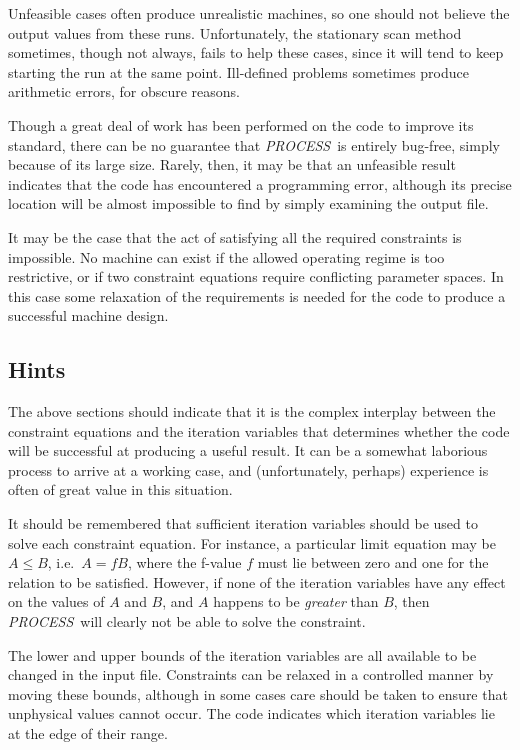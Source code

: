 \documentclass[11pt,a4paper]{report}
\newcommand{\PS}{\mbox{\it PROCESS\/ }}
\begin{document}
Unfeasible cases often produce unrealistic machines, so one should not believe
the output values from these runs. Unfortunately, the stationary scan method
sometimes, though not always, fails to help these cases, since it will tend to
keep starting the run at the same point. Ill-defined problems sometimes
produce arithmetic errors, for obscure reasons.

Though a great deal of work has been performed on the code to improve its
standard, there can be no guarantee that \PS is entirely bug-free, simply
because of its large size. Rarely, then, it may be that an unfeasible result
indicates that the code has encountered a programming error, although its
precise location will be almost impossible to find by simply examining the
output file.

It may be the case that the act of satisfying all the required constraints is
impossible. No machine can exist if the allowed operating regime is too
restrictive, or if two constraint equations require conflicting parameter
spaces. In this case some relaxation of the requirements is needed for the
code to produce a successful machine design.

\subsection{Hints}

The above sections should indicate that it is the complex interplay between
the constraint equations and the iteration variables that determines whether
the code will be successful at producing a useful result. It can be a somewhat
laborious process to arrive at a working case, and (unfortunately, perhaps)
experience is often of great value in this situation.

It should be remembered that sufficient iteration variables should be used to
solve each constraint equation. For instance, a particular limit equation may
be $A \leq B$, i.e.\ $A = fB$, where the f-value $f$ must lie between zero and
one for the relation to be satisfied.  However, if none of the iteration
variables have any effect on the values of $A$ and $B$, and $A$ happens to be
{\em greater}\/ than $B$, then \PS will clearly not be able to solve the
constraint.

The lower and upper bounds of the iteration variables are all available to be
changed in the input file. Constraints can be relaxed in a controlled manner
by moving these bounds, although in some cases care should be taken to ensure
that unphysical values cannot occur.  The code indicates which iteration
variables lie at the edge of their range.
\end{document}
